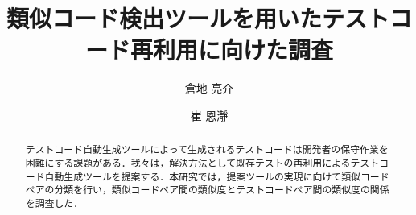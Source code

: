\documentclass{fose2019}           %
\title{類似コード検出ツールを用いたテストコード再利用に向けた調査}
\author{倉地 亮介}{Ryosuke Kurachi, 奈良先端科学技術大学院大学}
\author{崔 恩瀞}{Eunjong Choi, 京都工芸繊維大学}
\begin{document}
\maketitle


\begin{abstract}
テストコード自動生成ツールによって生成されるテストコードは開発者の保守作業を困難にする課題がある．我々は，解決方法として既存テストの再利用によるテストコード自動生成ツールを提案する．本研究では，提案ツールの実現に向けて類似コードペアの分類を行い，類似コードペア間の類似度とテストコードペア間の類似度の関係を調査した．
\end{abstract}

\end{document}

